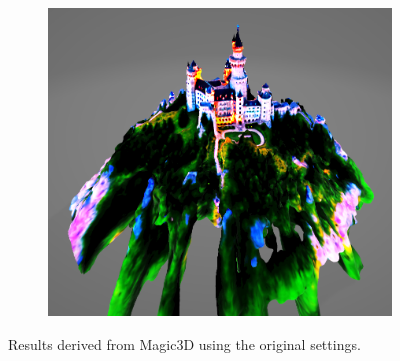 \begin{figure}[ht]
\begin{subfigure}[b]{0.187\textwidth}
        \caption{}
    \end{subfigure}
    \begin{subfigure}[b]{0.5\textwidth}
        \centering
        \includegraphics[width=\textwidth]{figures/appendix/magic3D_schloss_neuschwanstein.PNG}
        \caption{}
    \end{subfigure}
    \caption{Results derived from Magic3D \citep{lin2023magic3d} using the original settings.}\label{fig:magic3DOriginal}
\end{figure}


